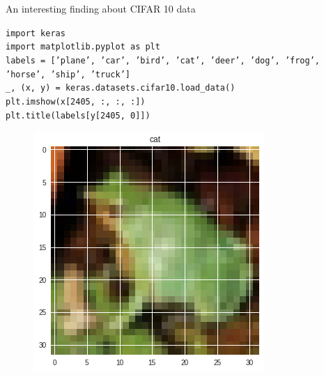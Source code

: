 \documentclass[final]{beamer}
\newlength{\sepwid}
\newlength{\onecolwid}
\newlength{\twocolwid}
\begin{document}
\begin{frame}[t]
\begin{columns}[t]
\begin{column}{\twocolwid}
\begin{columns}[t,totalwidth=\twocolwid]
\begin{column}{\onecolwid}

\end{column} %

\end{columns} %

\end{column} %

\begin{column}{\sepwid}\end{column} %

\begin{column}{\onecolwid} %

\begin{block}{An interesting finding about CIFAR 10 data}

\texttt{import keras} \\
\texttt{import matplotlib.pyplot as plt} \\

\texttt{labels = ['plane', 'car', 'bird', 'cat', 'deer', 'dog', 'frog', 'horse', 'ship', 'truck']} \\
\texttt{\_, (x, y) = keras.datasets.cifar10.load\_data()} \\
\texttt{plt.imshow(x[2405, :, :, :])} \\
\texttt{plt.title(labels[y[2405, 0]])}

\begin{figure}
\centering
\includegraphics[width=0.70\linewidth]{catfrog.png}
\end{figure}


\end{block}
\end{column}
\end{columns}
\end{frame}
\end{document}
